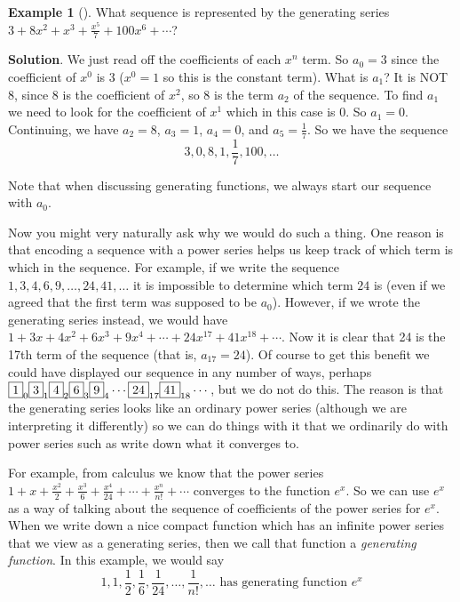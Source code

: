 \documentclass[10pt,]{book}
\theoremstyle{plain}
\theoremstyle{definition}
\theoremstyle{definition}
\newtheorem{example}[theorem]{Example}
\theoremstyle{definition}
\theoremstyle{definition}
\numberwithin{equation}{chapter}
\begin{document}
\begin{example}[]\label{example-22}
\hypertarget{p-1063}{}%
What sequence is represented by the generating series \(3 + 8x^2 + x^3 + \frac{x^5}{7} + 100x^6 + \cdots\)?%
\par\smallskip%
\noindent\textbf{Solution}.\hypertarget{solution-96}{}\quad%
\hypertarget{p-1064}{}%
We just read off the coefficients of each \(x^n\) term. So \(a_0 = 3\) since the coefficient of \(x^0\) is 3 (\(x^0 = 1\) so this is the constant term). What is \(a_1\)? It is NOT 8, since 8 is the coefficient of \(x^2\), so 8 is the term \(a_2\) of the sequence. To find \(a_1\) we need to look for the coefficient of \(x^1\) which in this case is 0. So \(a_1 = 0\). Continuing, we have \(a_2 = 8\), \(a_3 = 1\), \(a_4 = 0\), and \(a_5 = \frac{1}{7}\). So we have the sequence%
\begin{equation*}
3, 0, 8, 1, \frac{1}{7}, 100, \ldots
\end{equation*}
%
\par
\hypertarget{p-1065}{}%
Note that when discussing generating functions, we always start our sequence with \(a_0\).%
\end{example}
\hypertarget{p-1066}{}%
Now you might very naturally ask why we would do such a thing. One reason is that encoding a sequence with a power series helps us keep track of which term is which in the sequence. For example, if we write the sequence \(1, 3, 4, 6, 9, \ldots, 24, 41,\ldots\) it is impossible to determine which term \(24\) is (even if we agreed that the first term was supposed to be \(a_0\)). However, if we wrote the generating series instead, we would have \(1 + 3x + 4x^2 + 6x^3 + 9x^4 + \cdots + 24 x^{17} + 41 x^{18} + \cdots\). Now it is clear that 24 is the 17th term of the sequence (that is, \(a_{17} = 24\)). Of course to get this benefit we could have displayed our sequence in any number of ways, perhaps \(\fbox{1}_0 \fbox{3}_1 \fbox{4}_2 \fbox{6}_3 \fbox{9}_4 \cdots \fbox{24}_{17}\fbox{41}_{18}\cdots\), but we do not do this. The reason is that the generating series looks like an ordinary power series (although we are interpreting it differently) so we can do things with it that we ordinarily do with power series such as write down what it converges to.%
\par
\hypertarget{p-1067}{}%
For example, from calculus we know that the power series \(1 + x + \frac{x^2}{2} + \frac{x^3}{6} + \frac{x^4}{24} + \cdots + \frac{x^n}{n!} + \cdots\) converges to the function \(e^x\). So we can use \(e^x\) as a way of talking about the sequence of coefficients of the power series for \(e^x\). When we write down a nice compact function which has an infinite power series that we view as a generating series, then we call that function a \emph{generating function}. In this example, we would say%
\begin{equation*}
1, 1, \frac{1}{2}, \frac{1}{6}, \frac{1}{24}, \ldots, \frac{1}{n!}, \ldots \mbox{ has generating function }  e^x
\end{equation*}
%
\typeout{************************************************}
\typeout{************************************************}
\end{document}
